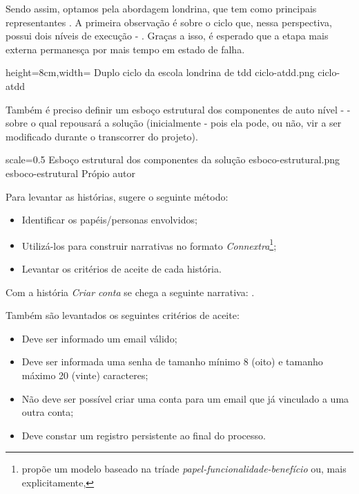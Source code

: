   Sendo assim, optamos pela abordagem londrina, que tem como principais representantes . A primeira observação é sobre o ciclo que, nessa perspectiva, possui dois níveis de execução - . Graças a isso, é esperado que a etapa mais externa permanesça por mais tempo em estado de falha.

  \imagem
    {height=8cm,width=\textwidth}
    {Duplo ciclo da escola londrina de tdd}
    {ciclo-atdd.png}
    {ciclo-atdd}
    {\cite[pág. 40, tradução nossa]{FreemanPryce2009}\footnotemark}

  Também é preciso definir um esboço estrutural dos componentes de auto nível -  - sobre o qual repousará a solução (inicialmente - pois ela pode, ou não, vir a ser modificado durante o transcorrer do projeto).

  \imagem
    {scale=0.5}
    {Esboço estrutural dos componentes da solução}
    {esboco-estrutural.png}
    {esboco-estrutural}
    {Própio autor\footnotemark}

  Para levantar as histórias,  sugere o seguinte método:
  \begin{itemize}
    \item Identificar os papéis/personas envolvidos;
    \item Utilizá-los para construir narrativas no formato \emph{Connextra}\footnote{ propõe um modelo baseado na tríade \emph{papel-funcionalidade-benefício} ou, mais explicitamente, };
    \item Levantar os critérios de aceite de cada história.
  \end{itemize}

  Com a história \emph{Criar conta} se chega a seguinte narrativa: .

  Também são levantados os seguintes critérios de aceite:
  \begin{itemize}
    \item Deve ser informado um email válido;
    \item Deve ser informada uma senha de tamanho mínimo 8 (oito) e tamanho máximo 20 (vinte) caracteres;
    \item Não deve ser possível criar uma conta para um email que já vinculado a uma outra conta;
    \item Deve constar um registro persistente ao final do processo.
  \end{itemize}

